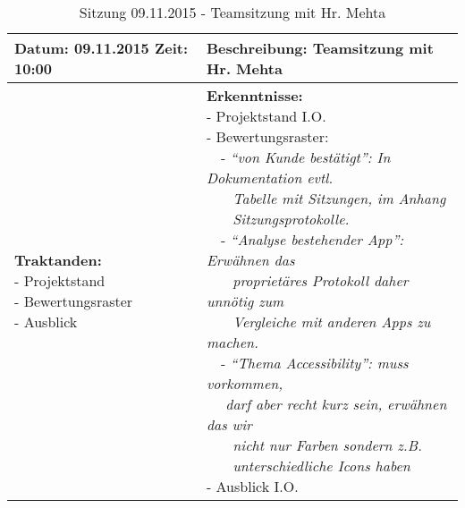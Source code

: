 \begin{table}[H]
\begin{tabularx}{\textwidth}{| l | X |}
\hline
\textbf{Datum:} 09.11.2015
\textbf{Zeit:} 10:00
&
\textbf{Beschreibung:} Teamsitzung mit Hr. Mehta \\ \hline
\specialcell[t]{
\textbf{Traktanden:}\\
- Projektstand\\
- Bewertungsraster\\
- Ausblick\\
}
& 
\specialcell[t]{
\textbf{Erkenntnisse:}\\
- Projektstand I.O.\\
- Bewertungsraster:\\
~~- \textit{\enquote{von Kunde bestätigt}: In Dokumentation evtl.}\\~~~ \textit{Tabelle mit Sitzungen, im Anhang}\\~~~ \textit{Sitzungsprotokolle.}\\
~~- \textit{\enquote{Analyse bestehender App}: Erwähnen das}\\~~~ \textit{proprietäres Protokoll daher unnötig zum}\\~~~ \textit{Vergleiche mit anderen Apps zu machen.}\\
~~- \textit{\enquote{Thema Accessibility}: muss vorkommen,}\\~~ \textit{darf aber recht kurz sein, erwähnen das wir}\\~~~ \textit{nicht nur Farben sondern z.B.}\\~~~ \textit{unterschiedliche Icons haben}\\
- Ausblick I.O.\\
}
\\ \hline
\end{tabularx}
\caption{Sitzung 09.11.2015 - Teamsitzung mit Hr. Mehta}
\end{table}



